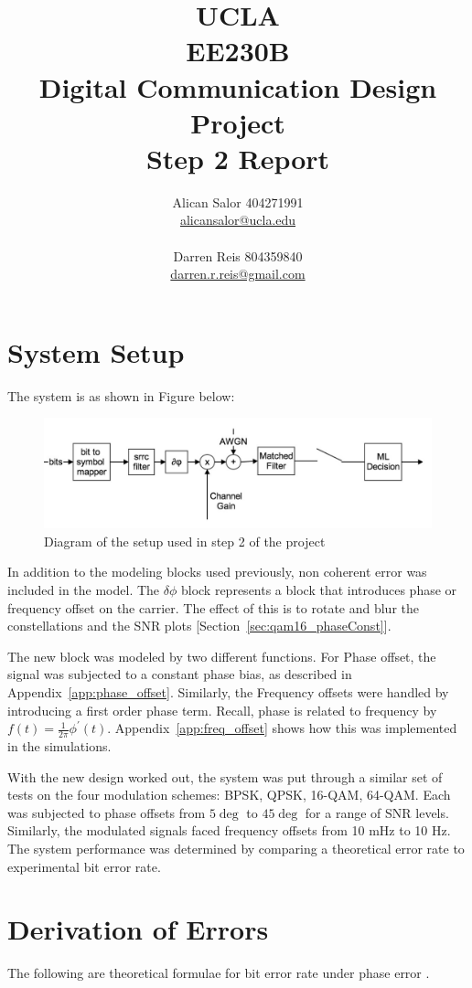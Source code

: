 \documentclass[]{article}
\title{UCLA\\EE230B\\Digital Communication Design Project\\Step 2 Report}
\author{Alican Salor 404271991 \\  \href{mailto:alicansalor@ucla.edu}{alicansalor@ucla.edu} \\ \\
Darren Reis 804359840 \\
\href{mailto:darrer.r.reis@gmail.com}{darren.r.reis@gmail.com} }
\begin{document}
\maketitle

\newpage
\tableofcontents

\newpage


\section{System Setup}
\label{sec:setup}
The system is as shown in Figure below:

\begin{figure}[H]
\centering
\includegraphics[width=\textwidth]{step2.jpg}
\caption{Diagram of the setup used in step 2 of the project}
\end{figure}

In addition to the modeling blocks used previously, non coherent error was included in the model.  The $\delta\phi$ block represents a block that introduces phase or frequency offset on the carrier.  The effect of this is to rotate and blur the constellations and the SNR plots [Section~\ref{sec:qam16_phaseConst}].

The new block was modeled by two different functions.  For Phase offset, the signal was subjected to a constant phase bias, as described in Appendix~\ref{app:phase_offset}.  Similarly, the Frequency offsets were handled by introducing a first order phase term.  Recall, phase is related to frequency by $f(t) = \frac{1}{2 \pi} \phi^\prime(t)$.  Appendix~\ref{app:freq_offset} shows how this was implemented in the simulations.

With the new design worked out, the system was put through a similar set of tests on the four modulation schemes: BPSK, QPSK, 16-QAM, 64-QAM.  Each was subjected to phase offsets from $5\deg$ to $45\deg$ for a range of SNR levels.  Similarly, the modulated signals faced frequency offsets from 10 mHz to 10 Hz.  The system performance was determined by comparing a theoretical error rate to experimental bit error rate.  
\section{Derivation of Errors}
\label{sec:errors}
The following are theoretical formulae for bit error rate under phase error \cite{howald}.
\end{document}

